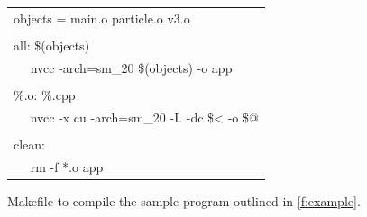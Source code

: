 \documentclass[11pt,letterpaper]{article}
\begin{document}
\begin{figure}
    \centering
    \begin{tabular}{p{}}
        objects = main.o particle.o v3.o \\
         \\
        all: \$(objects) \\
        $\quad$ nvcc -arch=sm\_20 \$(objects) -o app \\
         \\
        \%.o: \%.cpp \\
        $\quad$ nvcc -x cu -arch=sm\_20 -I. -dc  \$< -o  \$@ \\
         \\
        clean: \\
        $\quad$ rm -f *.o app \\
    \end{tabular}
    \caption{Makefile to compile the sample program outlined in \ref{f:example}.}
    \label{f:makefile}
\end{figure}

\end{document}
